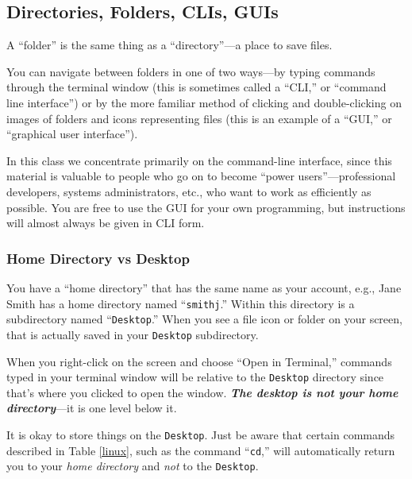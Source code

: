 


\subsection*{Directories, Folders, CLIs, GUIs}
\vspace{-0.1in}
A ``folder'' is the same thing as a ``directory''---a place to save
files. 

\noindent You can navigate
between folders in one of two ways---by typing commands through the
terminal window (this is sometimes called a ``CLI,'' or ``command line
interface'') or by the more familiar method of clicking and double-clicking
on images of folders and icons representing files (this is an example of
a ``GUI,'' or ``graphical user interface''). 

\noindent In this class we concentrate primarily on the command-line interface, since
this material is valuable to people who go on to become 
``power users''---professional
developers, systems administrators, etc., who want to work as
efficiently as possible. You are free to use the GUI
for your own programming, but instructions will almost always
be given in CLI form.

\subsubsection*{Home Directory vs Desktop}
\vspace{-0.1in}
You have a ``home
directory'' that has the same name as your account, e.g., Jane Smith has
a home directory named ``{\tt smithj}.'' Within this directory is
a subdirectory named ``{\tt Desktop}.'' When you see a file icon or folder
on your screen, that is actually saved in your {\tt Desktop}
subdirectory.

\noindent When you right-click on the screen and choose ``Open in Terminal,'' commands
typed in your
terminal window will be relative to the {\tt Desktop} directory since that's 
where you clicked to open the window. \textbf{\textit{The desktop is 
{\em not} your home directory}}---it is one 
level below it.

\noindent It is okay to store things on the {\tt Desktop}. Just be aware that certain
commands described in Table \ref{linux}, such as the command ``{\tt cd},'' 
will automatically return you to your {\em home directory}
and {\em not} to the {\tt Desktop}.

